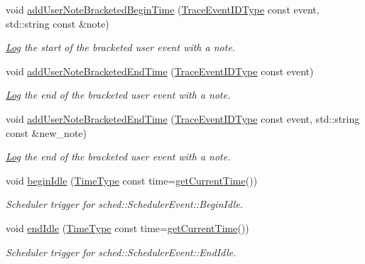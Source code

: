 \begin{DoxyCompactItemize}
void \hyperlink{structvt_1_1trace_1_1_trace_lite_a59a0b6cb32b331627f29ac25008621e8}{add\+User\+Note\+Bracketed\+Begin\+Time} (\hyperlink{namespacevt_1_1trace_a64a7185f3e102df8d8258f263ccd1582}{Trace\+Event\+I\+D\+Type} const event, std\+::string const \&note)
\begin{DoxyCompactList}\small\item\em \hyperlink{structvt_1_1trace_1_1_log}{Log} the start of the bracketed user event with a note. \end{DoxyCompactList}\item 
void \hyperlink{structvt_1_1trace_1_1_trace_lite_a07851d924db8f8a07e4dd68db0fc28e5}{add\+User\+Note\+Bracketed\+End\+Time} (\hyperlink{namespacevt_1_1trace_a64a7185f3e102df8d8258f263ccd1582}{Trace\+Event\+I\+D\+Type} const event)
\begin{DoxyCompactList}\small\item\em \hyperlink{structvt_1_1trace_1_1_log}{Log} the end of the bracketed user event with a note. \end{DoxyCompactList}\item 
void \hyperlink{structvt_1_1trace_1_1_trace_lite_a98d0f24ca2f8c70fc2c5fcc2e97b0023}{add\+User\+Note\+Bracketed\+End\+Time} (\hyperlink{namespacevt_1_1trace_a64a7185f3e102df8d8258f263ccd1582}{Trace\+Event\+I\+D\+Type} const event, std\+::string const \&new\+\_\+note)
\begin{DoxyCompactList}\small\item\em \hyperlink{structvt_1_1trace_1_1_log}{Log} the end of the bracketed user event with a note. \end{DoxyCompactList}\item 
void \hyperlink{structvt_1_1trace_1_1_trace_lite_af6c182ffc1b51c64e94a53787a2fc8e7}{begin\+Idle} (\hyperlink{namespacevt_a2b9f28078dc309ad0706b69ded743e69}{Time\+Type} const time=\hyperlink{structvt_1_1trace_1_1_trace_lite_a5ddfc40d8206946d33630d4b81b6126c}{get\+Current\+Time}())
\begin{DoxyCompactList}\small\item\em Scheduler trigger for {\ttfamily sched\+::\+Scheduler\+Event\+::\+Begin\+Idle}. \end{DoxyCompactList}\item 
void \hyperlink{structvt_1_1trace_1_1_trace_lite_a7db54aece996aa01a4ee583f0ec919f1}{end\+Idle} (\hyperlink{namespacevt_a2b9f28078dc309ad0706b69ded743e69}{Time\+Type} const time=\hyperlink{structvt_1_1trace_1_1_trace_lite_a5ddfc40d8206946d33630d4b81b6126c}{get\+Current\+Time}())
\begin{DoxyCompactList}\small\item\em Scheduler trigger for {\ttfamily sched\+::\+Scheduler\+Event\+::\+End\+Idle}. \end{DoxyCompactList}\item 

\end{DoxyCompactItemize}
